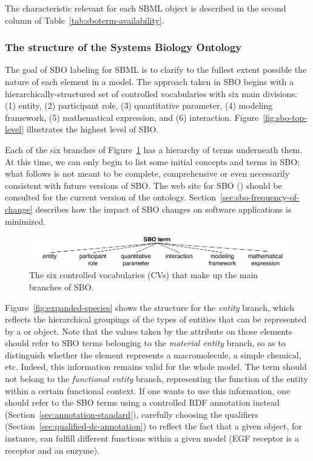 The characteristic relevant for each SBML object is described in
the second column of Table~\ref{tab:sboterm-availability}.


\subsubsection{The structure of the Systems Biology Ontology}

The goal of SBO labeling for SBML is to clarify to the fullest
extent possible the nature of each element in a model.  The
approach taken in SBO begins with a hierarchically-structured set
of controlled vocabularies with six main divisions: (1) entity,
(2) participant role, (3) quantitative parameter, (4) modeling
framework, (5) mathematical expression, and (6) interaction.
Figure~\vref{fig:sbo-top-level} illustrates the highest level of
SBO.

Each of the six branches of Figure~\ref{fig:sbo-top-level} has a
hierarchy of terms underneath them.  At this time, we can only
begin to list some initial concepts and terms in SBO; what follows
is not meant to be complete, comprehensive or even necessarily
consistent with future versions of SBO.  The web site for SBO
(\sboref) should be consulted for the current version of the
ontology.  Section~\ref{sec:sbo-frequency-of-change} describes how
the impact of SBO changes on software applications is minimized.

\begin{figure}[tbh]
  \centering
  \includegraphics[scale = 0.8]{figs/sbo-top-level}
  \vspace*{1ex}
  \caption{The six controlled vocabularies (CVs) that
      make up the main branches of SBO.}
  \label{fig:sbo-top-level}
\end{figure}

Figure~\vref{fig:expanded-species} shows the structure for the
\emph{entity} branch, which reflects the hierarchical groupings of
the types of entities that can be represented by a \Compartment or
\Species object.  Note that the values taken by the
 attribute on those elements should refer to SBO
terms belonging to the \emph{material entity} branch, so as to
distinguish whether the element represents a macromolecule, a
simple chemical, etc.  Indeed, this information remains valid for
the whole model. The term should not belong to the
\emph{functional entity} branch, representing the function of the
entity within a certain functional context. If one wants to use
this information, one should refer to the SBO terms using a
controlled RDF annotation instead
(Section~\ref{sec:annotation-standard}), carefully choosing the
qualifiers (Section~\ref{sec:qualified-dc-annotation}) to reflect
the fact that a given \Species object, for instance, can fulfill
different functions within a given model (\eg EGF receptor is a
receptor and an enzyme).

